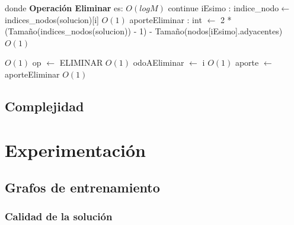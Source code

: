 \documentclass[a4paper, 10pt, twoside]{article}
\newenvironment{pseudo}[1][]{%
    \vspace{1em}%
    \begin{algorithmic}%
}
{%
    \end{algorithmic}%
    \vspace{1em}%
}
\newcommand{\Ode}[1]{\hfill $O(#1)$}
\begin{document}
\begin{pseudo}
\State
\State donde \textbf{Operación Eliminar} es:
\State
																					\Ode{log M}
				  \State continue
			\EndIf
			\State iEsimo : indice\_nodo$\leftarrow$ indices\_nodos(solucion)[i]									\Ode{1}
			\State aporteEliminar : int $\leftarrow$ 2 * (Tamaño(indices\_nodos(solucion)) - 1) -
			\State Tamaño(nodos[iEsimo].adyacentes)																	\Ode{1}

																						\Ode{1}
				\State op $\leftarrow$ ELIMINAR 																	\Ode{1}
				\State odoAEliminar $\leftarrow$ i 																	\Ode{1}
				\State aporte $\leftarrow$ aporteEliminar 															\Ode{1}
			\EndIf
		\EndFor

\State

\end{pseudo}

\subsection{Complejidad}



\newpage


\section{Experimentación}


\subsection{Grafos de entrenamiento}


\subsubsection{Calidad de la solución}

\begin{figure}[H]
	
\end{figure}

\begin{figure}[H]
	
\end{figure}
\end{document}
